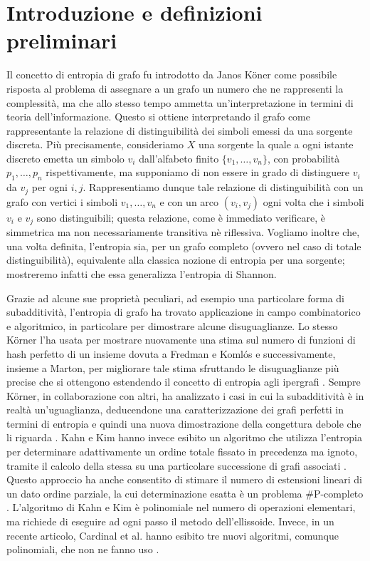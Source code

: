 \chapter{Introduzione e definizioni preliminari} Il concetto di entropia di grafo fu introdotto da Janos K\"oner come possibile risposta al problema di assegnare a un grafo un numero che ne rappresenti la complessità, ma che allo stesso tempo ammetta un'interpretazione in termini di teoria dell'informazione. \cite{Korner1973} Questo si ottiene interpretando il grafo come rappresentante la relazione di distinguibilità dei simboli emessi da una sorgente discreta. Più precisamente, consideriamo $X$ una sorgente la quale a ogni istante discreto emetta un simbolo $v_i$ dall'alfabeto finito $\{v_1,\dots,v_n\}$, con probabilità $p_1,\dots,p_n$ rispettivamente, ma supponiamo di non essere in grado di distinguere $v_i$ da $v_j$ per ogni $i,j$. Rappresentiamo dunque tale relazione di distinguibilità con un grafo con vertici i simboli $v_1,\dots,v_n$ e con un arco $(v_i,v_j)$ ogni volta che i simboli $v_i$ e $v_j$ sono distinguibili; questa relazione, come è immediato verificare, è simmetrica ma non necessariamente transitiva nè riflessiva. Vogliamo inoltre che, una volta definita, l'entropia sia, per un grafo completo (ovvero nel caso di totale distinguibilità), equivalente alla classica nozione di entropia per una sorgente; mostreremo infatti che essa generalizza l'entropia di Shannon.

Grazie ad alcune sue proprietà peculiari, ad esempio una particolare forma di subadditività, l'entropia di grafo ha trovato applicazione in campo combinatorico e algoritmico, in particolare per dimostrare alcune disuguaglianze. Lo stesso K\"orner l'ha usata per mostrare nuovamente una stima sul numero di funzioni di hash perfetto di un insieme dovuta a Fredman e Koml\'os \cite{Korner1986} e successivamente, insieme a Marton, per migliorare tale stima sfruttando le disuguaglianze più precise che si ottengono estendendo il concetto di entropia agli ipergrafi \cite{Korner1990}. Sempre K\"orner, in collaborazione con altri, ha analizzato i casi in cui la subadditività è in realtà un'uguaglianza, deducendone una caratterizzazione dei grafi perfetti in termini di entropia e quindi una nuova dimostrazione della congettura debole che li riguarda \cite{Csiszar1990}. Kahn e Kim hanno invece esibito un algoritmo che utilizza l'entropia per determinare adattivamente un ordine totale fissato in precedenza ma ignoto, tramite il calcolo della stessa su una particolare successione di grafi associati \cite{Kahn1995}. Questo approccio ha anche consentito di stimare il numero di estensioni lineari di un dato ordine parziale, la cui determinazione esatta è un problema \#P-completo \cite{Brightwell1991}. L'algoritmo di Kahn e Kim \`e polinomiale nel numero di operazioni elementari, ma richiede di eseguire ad ogni passo il metodo dell'ellissoide. Invece, in un recente articolo, Cardinal et al. hanno esibito tre nuovi algoritmi, comunque polinomiali, che non ne fanno uso \cite{Cardinal2010}.

